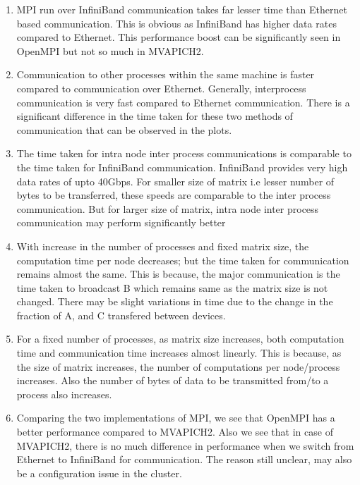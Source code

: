 \documentclass[10pt]{article}
\begin{document}
\begin{enumerate}
\item MPI run over InfiniBand communication takes far lesser time than Ethernet based communication. This is obvious as InfiniBand has higher data rates compared to Ethernet. This performance boost can be significantly seen in OpenMPI but not so much in MVAPICH2.

\item Communication to other processes within the same machine is faster compared to communication over Ethernet. Generally, interprocess communication is very fast compared to Ethernet communication. There is a significant difference in the time taken for these two methods of communication that can be observed in the plots.
 
\item The time taken for intra node inter process communications is comparable to the time taken for InfiniBand communication. InfiniBand provides very high data rates of upto 40Gbps. For smaller size of matrix i.e lesser number of bytes to be transferred, these speeds are comparable to the inter process communication. But for larger size of matrix, intra node inter process communication may perform significantly better

\item With increase in the number of processes and fixed matrix size, the computation time per node decreases; but the time taken for communication remains almost the same. This is because, the major communication is the time taken to broadcast B which remains same as the matrix size is not changed. There may be slight variations in time due to the change in the fraction of A, and C transfered between devices.

\item For a fixed number of processes, as matrix size increases, both computation time and communication time increases almost linearly. This is because, as the size of matrix increases, the number of computations per node/process increases. Also the number of bytes of data to be transmitted from/to a process also increases.
 
\item Comparing the two implementations of MPI, we see that OpenMPI has a better performance compared to MVAPICH2. Also we see that in case of MVAPICH2, there is no much difference in performance when we switch from Ethernet to InfiniBand for communication. The reason still unclear, may also be a configuration issue in the cluster.
\end{enumerate}
\end{document}
